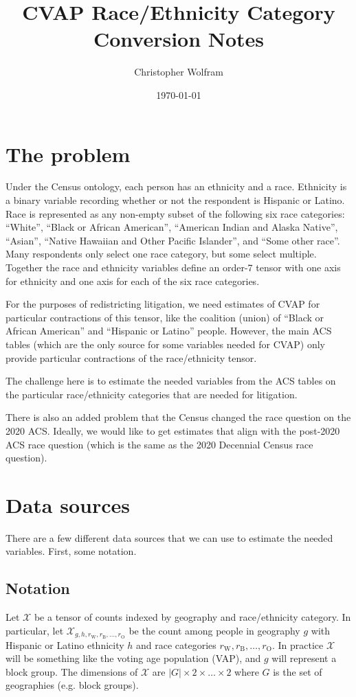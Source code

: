 \documentclass[12pt]{article}
\title{CVAP Race/Ethnicity Category Conversion Notes}
\author{Christopher Wolfram}
\date{\today}
\begin{document}
\maketitle

\section{The problem}
Under the Census ontology, each person has an ethnicity and a race. Ethnicity is a binary variable recording whether or not the respondent is Hispanic or Latino. Race is represented as any non-empty subset of the following six race categories: ``White'', ``Black or African American'', ``American Indian and Alaska Native'', ``Asian'', ``Native Hawaiian and Other Pacific Islander'', and ``Some other race''. Many respondents only select one race category, but some select multiple. Together the race and ethnicity variables define an order-7 tensor with one axis for ethnicity and one axis for each of the six race categories.

For the purposes of redistricting litigation, we need estimates of CVAP for particular contractions of this tensor, like the coalition (union) of ``Black or African American'' and ``Hispanic or Latino'' people. However, the main ACS tables (which are the only source for some variables needed for CVAP) only provide particular contractions of the race/ethnicity tensor.

The challenge here is to estimate the needed variables from the ACS tables on the particular race/ethnicity categories that are needed for litigation.

There is also an added problem that the Census changed the race question on the 2020 ACS. Ideally, we would like to get estimates that align with the post-2020 ACS race question (which is the same as the 2020 Decennial Census race question).


\section{Data sources}
There are a few different data sources that we can use to estimate the needed variables. First, some notation.

\newcommand{\var}{\mathcal{X}}
\newcommand{\rc}[1]{r_{\textrm{#1}}}
\subsection{Notation}
Let $\var$ be a tensor of counts indexed by geography and race/ethnicity category. In particular, let $\var_{g,h,\rc{W},\rc{B},\ldots,\rc{O}}$ be the count among people in geography $g$ with Hispanic or Latino ethnicity $h$ and race categories $r_\textrm{W},r_\textrm{B},\ldots,r_\textrm{O}$. In practice $\var$ will be something like the voting age population (VAP), and $g$ will represent a block group. The dimensions of $\var$ are $|G| \times 2 \times \dots \times 2$ where $G$ is the set of geographies (e.g. block groups).
\end{document}
